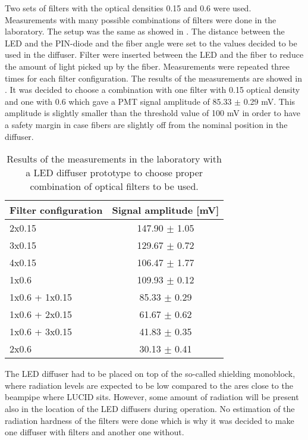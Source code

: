 Two sets of filters with the optical densities 0.15 and 0.6 were used. 
Measurements with many possible combinations of filters were done in the laboratory.
The setup was the same as showed in . The distance between the LED and the PIN-diode 
and the fiber angle were set to the values 
decided to be used in the diffuser. 
Filter were inserted between the LED and the fiber to reduce the amount of light picked up by the fiber.
Measurements were repeated three times for each filter configuration. The results of the measurements are showed in .
It was decided to choose a combination with one filter with 0.15 optical density and one with 0.6 which gave a PMT signal amplitude of 85.33 $\pm$ 0.29 mV.
This amplitude is slightly smaller than the threshold value of 100 mV in order to have a safety margin in case fibers 
are slightly off from the nominal position in the diffuser.

\begin{table}[bp]
  \begin{tabular}{l|c}
    Filter configuration & Signal amplitude [mV]\\
    \hline
    2x0.15       	&	147.90	$\pm$	1.05	\\
    3x0.15       	&	129.67	$\pm$	0.72	\\
    4x0.15       	&	106.47	$\pm$	1.77	\\
    1x0.6          	&	109.93	$\pm$	0.12	\\
    1x0.6 + 1x0.15 	&	85.33	$\pm$	0.29	\\
    1x0.6 + 2x0.15 	&	61.67	$\pm$	0.62	\\
    1x0.6 + 3x0.15 	&	41.83	$\pm$	0.35	\\
    2x0.6	        &	30.13	$\pm$	0.41	\\
  \end{tabular}
  \caption{Results of the measurements in the laboratory with a LED diffuser prototype to choose proper combination of optical filters to be used.}
  \label{tab:FilterChoice}
\end{table}

The LED diffuser had to be placed on top of the so-called shielding monoblock, where radiation levels are expected to be low compared to the ares 
close to the beampipe where LUCID sits.
However, some amount of radiation will be present also in the location of the LED diffusers during operation.
No estimation of the radiation hardness of the filters were done which is why it was decided to make one diffuser with filters and another one without.

